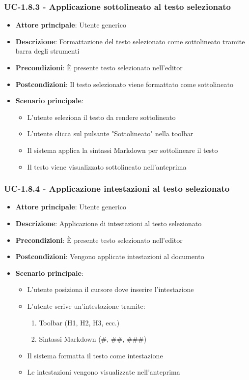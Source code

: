 \documentclass[11pt,a4paper]{article}
\begin{document}
\subsubsection{UC-1.8.3 - Applicazione sottolineato al testo selezionato}
\begin{itemize}
    \item \textbf{Attore principale}: Utente generico
    \item \textbf{Descrizione}: Formattazione del testo selezionato come sottolineato tramite barra degli strumenti
    \item \textbf{Precondizioni}: È presente testo selezionato nell'editor
    \item \textbf{Postcondizioni}: Il testo selezionato viene formattato come sottolineato
    \item \textbf{Scenario principale}:
        \begin{itemize}
            \item L'utente seleziona il testo da rendere sottolineato
            \item L'utente clicca sul pulsante "Sottolineato" nella toolbar
            \item Il sistema applica la sintassi Markdown per sottolineare il testo
            \item Il testo viene visualizzato sottolineato nell'anteprima
        \end{itemize}
\end{itemize}

\subsubsection{UC-1.8.4 - Applicazione intestazioni al testo selezionato}
\begin{itemize}
    \item \textbf{Attore principale}: Utente generico
    \item \textbf{Descrizione}: Applicazione di intestazioni al testo selezionato
    \item \textbf{Precondizioni}: È presente testo selezionato nell’editor
    \item \textbf{Postcondizioni}: Vengono applicate intestazioni al documento
    \item \textbf{Scenario principale}:
        \begin{itemize}
            \item L'utente posiziona il cursore dove inserire l'intestazione
            \item L'utente scrive un'intestazione tramite:
                \begin{enumerate}
                    \item Toolbar (H1, H2, H3, ecc.)
                    \item Sintassi Markdown (\#, \#\#, \#\#\#)
                \end{enumerate}
            \item Il sistema formatta il testo come intestazione
            \item Le intestazioni vengono visualizzate nell'anteprima
        \end{itemize}
\end{itemize}
\end{document}
